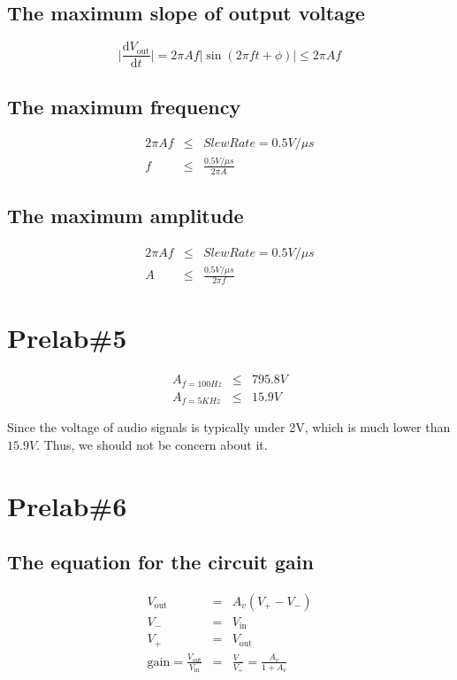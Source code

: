 \documentclass{IEEEtran}
\begin{document}
	\subsection{The maximum slope of output voltage}
	\begin{equation}
		\bigg|\frac{\mathrm{d}V_{\mathrm{out}}}{\mathrm{d}t}\bigg| = 2\pi Af|\sin(2\pi ft+\phi)| \le 2\pi Af
	\end{equation}
	\subsection{The maximum frequency}
	\begin{eqnarray}
		2\pi Af & \le & SlewRate = 0.5\si{V/\mu s} \\
		f & \le & \frac{0.5\si{V/\mu s}}{2\pi A}
	\end{eqnarray}
	\subsection{The maximum amplitude}
	\begin{eqnarray}
		2\pi Af & \le & SlewRate = 0.5\si{V/\mu s} \\
		A & \le & \frac{0.5\si{V/\mu s}}{2\pi f}
	\end{eqnarray}
	
	\section{\textbf{Prelab\#5}}
	\begin{eqnarray}
		A_{f=100\si{Hz}} & \le & 795.8\si{V} \\
		A_{f=5\si{KHz}} & \le & 15.9\si{V}
	\end{eqnarray}
		
	Since the voltage of audio signals is typically under 2V, which is much lower than $15.9\si{V}$. Thus, we should not be concern about it.
	
	\section{\textbf{Prelab\#6}}
	\subsection{The equation for the circuit gain}
	\begin{eqnarray}
		V_{\mathrm{out}} & = & A_v(V_+-V_-) \\
		V_- & = & V_{\mathrm{in}} \\
		V_+ & = & V_{\mathrm{out}} \\
		\mathrm{gain} = \frac{V_{\mathrm{out}}}{V_{\mathrm{in}}} & = & \frac{V_-}{V_+} = \frac{A_v}{1 + A_v}
	\end{eqnarray}
\end{document}
